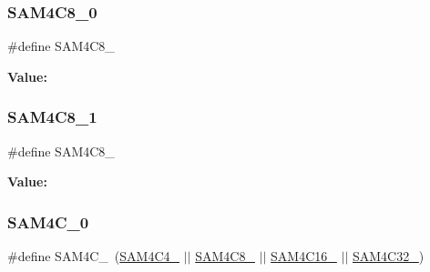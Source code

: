 \mbox{\label{group__sam__part__macros__group_ga6210432e77e4bc0e170dc71370a3e845}} 
\subsubsection{\texorpdfstring{SAM4C8\_0}{SAM4C8\_0}}
{\footnotesize\ttfamily \#define S\+A\+M4\+C8\+\_}

{\bfseries Value\+:}
\begin{DoxyCode}{0}
\DoxyCodeLine{( \(\backslash\)}
\DoxyCodeLine{        )}

\end{DoxyCode}
\mbox{\label{group__sam__part__macros__group_ga349700d2ac7573d426776e85f7632361}} 
\subsubsection{\texorpdfstring{SAM4C8\_1}{SAM4C8\_1}}
{\footnotesize\ttfamily \#define S\+A\+M4\+C8\+\_}

{\bfseries Value\+:}
\begin{DoxyCode}{0}
\DoxyCodeLine{( \(\backslash\)}
\DoxyCodeLine{        )}

\end{DoxyCode}
\mbox{\label{group__sam__part__macros__group_ga5033d451b0d964e7a95f7b70a33dec8b}} 
\subsubsection{\texorpdfstring{SAM4C\_0}{SAM4C\_0}}
{\footnotesize\ttfamily \#define S\+A\+M4\+C\+\_~(\mbox{\hyperlink{group__sam__part__macros__group_ga77c44ef9d719d70486f81402ebee7b27}{S\+A\+M4\+C4\+\_}} $\vert$$\vert$ \mbox{\hyperlink{group__sam__part__macros__group_ga6210432e77e4bc0e170dc71370a3e845}{S\+A\+M4\+C8\+\_}} $\vert$$\vert$ \mbox{\hyperlink{group__sam__part__macros__group_ga933b4554835e5159623415812db1400e}{S\+A\+M4\+C16\+\_}} $\vert$$\vert$ \mbox{\hyperlink{group__sam__part__macros__group_ga80a3a5850f6f7ac1b16a781c63e46c67}{S\+A\+M4\+C32\+\_}})}

